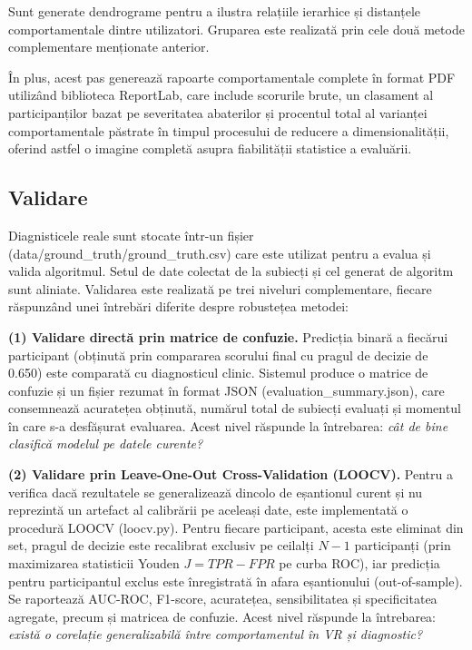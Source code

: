 \documentclass[12pt,a4paper]{report}
\theoremstyle{definition}
\theoremstyle{remark}
\begin{document}
Sunt generate dendrograme pentru a ilustra relațiile ierarhice și distanțele comportamentale dintre utilizatori. Gruparea este realizată prin cele două metode complementare menționate anterior. 

În plus, acest pas generează rapoarte comportamentale complete în format PDF utilizând biblioteca ReportLab, care include scorurile brute, un clasament al participanților bazat pe severitatea abaterilor și procentul total al varianței comportamentale păstrate în timpul procesului de reducere a dimensionalității, oferind astfel o imagine completă asupra fiabilității statistice a evaluării. 

\subsection{Validare}

Diagnisticele reale sunt stocate într-un fișier (data/ground\_truth/ground\_truth.csv) care este utilizat pentru a evalua și valida algoritmul. Setul de date colectat de la subiecți și cel generat de algoritm sunt aliniate. Validarea este realizată pe trei niveluri complementare, fiecare răspunzând unei întrebări diferite despre robustețea metodei:

\textbf{(1) Validare directă prin matrice de confuzie.} Predicția binară a fiecărui participant (obținută prin compararea scorului final cu pragul de decizie de 0.650) este comparată cu diagnosticul clinic. Sistemul produce o matrice de confuzie și un fișier rezumat în format JSON (evaluation\_summary.json), care consemnează acuratețea obținută, numărul total de subiecți evaluați și momentul în care s-a desfășurat evaluarea. Acest nivel răspunde la întrebarea: \textit{cât de bine clasifică modelul pe datele curente?}

\textbf{(2) Validare prin Leave-One-Out Cross-Validation (LOOCV).} Pentru a verifica dacă rezultatele se generalizează dincolo de eșantionul curent și nu reprezintă un artefact al calibrării pe aceleași date, este implementată o procedură LOOCV (loocv.py). Pentru fiecare participant, acesta este eliminat din set, pragul de decizie este recalibrat exclusiv pe ceilalți $N-1$ participanți (prin maximizarea statisticii Youden $J = TPR - FPR$ pe curba ROC), iar predicția pentru participantul exclus este înregistrată în afara eșantionului (out-of-sample). Se raportează AUC-ROC, F1-score, acuratețea, sensibilitatea și specificitatea agregate, precum și matricea de confuzie. Acest nivel răspunde la întrebarea: \textit{există o corelație generalizabilă între comportamentul în VR și diagnostic?}
\end{document}
